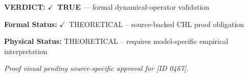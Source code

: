 \textbf{VERDICT:} \ensuremath{\checkmark}\ \textbf{TRUE} --- formal dynamical-operator validation

\textbf{Formal Status:} \ensuremath{\checkmark}\ THEORETICAL -- source-backed CHL proof obligation

\textbf{Physical Status:} THEORETICAL -- requires model-specific empirical interpretation
\par\vspace{0.45em}
\par
\vfill
\begingroup\footnotesize\itshape
Proof visual pending source-specific approval for [ID 0467].
\par\endgroup
\vfill
\endgroup
\endgroup
